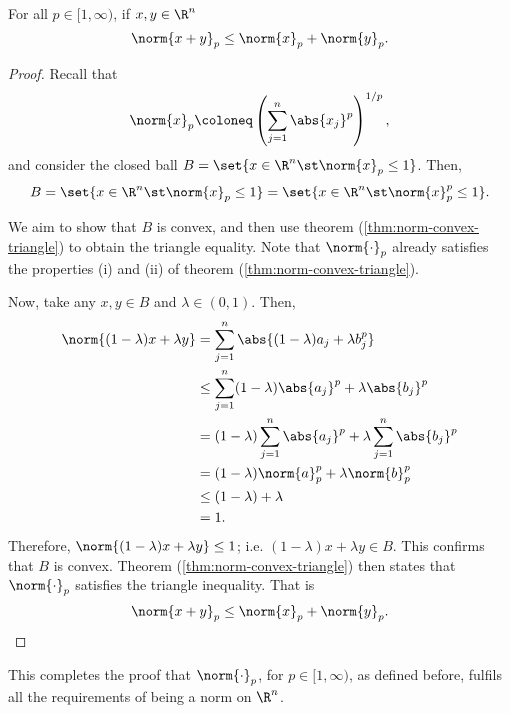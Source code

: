 \begin{ncor}
  For all $p \in [1,\infty)$, if $x, y \in \R^n$
  \begin{equation*}
    \norm{x+y}_{p} \leq \norm{x}_{p} + \norm{y}_{p}.
  \end{equation*}
\end{ncor}
\begin{proof}
  Recall that
  \begin{equation*}
    \norm{x}_{p} \coloneq \left(\sum_{j=1}^{n} \abs{x_j}^{p}\right)^{1/p},
  \end{equation*}
  and consider the closed ball $B = \set{x \in \R^n \st \norm{x}_p \leq 1}$. Then,
  \begin{equation*}
    B = \set{x \in \R^n \st \norm{x}_p \leq 1} = \set{x \in \R^n \st \norm{x}_{p}^{p} \leq 1}.
  \end{equation*}

  We aim to show that $B$ is convex, and then use theorem (\ref{thm:norm-convex-triangle}) to obtain the triangle equality. Note that $\norm{\cdot}_{p}$ already satisfies the properties (i) and (ii) of theorem (\ref{thm:norm-convex-triangle}).

  Now, take any $x,y \in B$ and $\lambda \in (0,1)$. Then,
  \begin{align*}
  \norm{(1-\lambda) x + \lambda y}
  &= \sum_{j=1}^{n} \abs{(1-\lambda) a_j + \lambda b_j^{p}}\\
  &\leq \sum_{j=1}^{n} (1-\lambda) \abs{a_j}^{p} + \lambda \abs{b_j}^{p}\\
  &= (1-\lambda)\sum_{j=1}^{n} \abs{a_j}^{p} + \lambda \sum_{j=1}^{n} \abs{b_j}^{p} \\
  &= (1-\lambda)\norm{a}_{p}^{p}+\lambda\norm{b}_{p}^{p}\\
  &\leq (1-\lambda)+\lambda\\
  &= 1.
  \end{align*}
  Therefore, $\norm{(1-\lambda) x + \lambda y} \leq 1$; i.e. $(1-\lambda) x + \lambda y \in B$. This confirms that $B$ is convex. Theorem (\ref{thm:norm-convex-triangle}) then states that $\norm{\cdot}_{p}$ satisfies the triangle inequality. That is
  \begin{equation*}
  \norm{x+y}_{p} \leq \norm{x}_{p} + \norm{y}_{p}.\qedhere
  \end{equation*}
\end{proof}

\begin{remark}
  This completes the proof that $\norm{\cdot}_{p}$, for $p \in [1,\infty)$, as defined before, fulfils all the requirements of being a norm on $\R^n$.
\end{remark}

